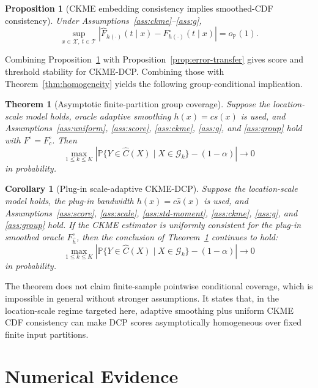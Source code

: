 \documentclass[11pt]{article}
\newtheorem{proposition}{Proposition}
\newtheorem{theorem}{Theorem}
\newtheorem{corollary}{Corollary}
\newcommand{\Xcal}{\mathcal X}
\newcommand{\Gcal}{\mathcal G}
\newcommand{\Tcal}{\mathcal T}
\newcommand{\Pp}{\mathbb P}
\newcommand{\abs}[1]{\left\lvert #1 \right\rvert}
\newcommand{\op}{o_{\mathbb P}}
\newif\ifincludeexperiments
\begin{document}
\begin{proposition}[CKME embedding consistency implies smoothed-CDF consistency]
\label{prop:ckme-cdf}
Under Assumptions~\ref{ass:ckme}--\ref{ass:g},
\[
  \sup_{x\in\Xcal,\ t\in\Tcal}
  \abs{\widehat F_{h(\cdot)}(t\mid x)-F_{h(\cdot)}^\circ(t\mid x)}
  =\op(1).
\]
\end{proposition}

Combining Proposition~\ref{prop:ckme-cdf} with Proposition~\ref{prop:error-transfer} gives score and threshold stability for CKME-DCP. Combining those with Theorem~\ref{thm:homogeneity} yields the following group-conditional implication.

\begin{theorem}[Asymptotic finite-partition group coverage]
\label{thm:group}
Suppose the location-scale model holds, oracle adaptive smoothing \(h(x)=c s(x)\) is used, and Assumptions~\ref{ass:uniform}, \ref{ass:score}, \ref{ass:ckme}, \ref{ass:g}, and \ref{ass:group} hold with \(F^\circ=F_c^\circ\). Then
\[
  \max_{1\le k\le K}
  \abs{
  \Pp\{Y\in\widehat C(X)\mid X\in\Gcal_k\}
  -(1-\alpha)
  }
  \to 0
\]
in probability.
\end{theorem}

\begin{corollary}[Plug-in scale-adaptive CKME-DCP]
\label{cor:plugin-group}
Suppose the location-scale model holds, the plug-in bandwidth \(h(x)=c\widehat s(x)\) is used, and Assumptions~\ref{ass:score}, \ref{ass:scale}, \ref{ass:std-moment}, \ref{ass:ckme}, \ref{ass:g}, and \ref{ass:group} hold. If the CKME estimator is uniformly consistent for the plug-in smoothed oracle \(F_{\widehat h}^{\circ}\), then the conclusion of Theorem~\ref{thm:group} continues to hold:
\[
  \max_{1\le k\le K}
  \abs{
  \Pp\{Y\in\widehat C(X)\mid X\in\Gcal_k\}
  -(1-\alpha)
  }
  \to 0
\]
in probability.
\end{corollary}

The theorem does not claim finite-sample pointwise conditional coverage, which is impossible in general without stronger assumptions. It states that, in the location-scale regime targeted here, adaptive smoothing plus uniform CKME CDF consistency can make DCP scores asymptotically homogeneous over fixed finite input partitions.

\ifincludeexperiments
\section{Numerical Evidence}
\label{sec:experiments}
\end{document}
